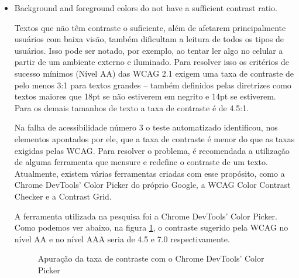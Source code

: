\documentclass[
	12pt,				%
	openright,			%
	oneside,			%
	a4paper,			%
	chapter=TITLE,		%
	section=TITLE,		%
	subsection=TITLE,	%
	subsubsection=TITLE,%
	english,			%
	brazil				%
	]{abntex2}
\theoremstyle{definition}
\begin{document}
\begin{itemize}
\pagebreak

   \item Background and foreground colors do not have a sufficient contrast ratio.
   
Textos que não têm contraste o suficiente, além de afetarem principalmente usuários com baixa visão, também dificultam a leitura de todos os tipos de usuários. Isso pode ser notado, por exemplo, ao tentar ler algo no celular a partir de um ambiente externo e iluminado. Para resolver isso os critérios de sucesso mínimos (Nível AA) das WCAG 2.1 exigem uma taxa de contraste de pelo menos 3:1 para textos grandes – também definidos pelas diretrizes como textos maiores que 18pt se não estiverem em negrito e 14pt se estiverem. Para os demais tamanhos de texto a taxa de contraste é de 4.5:1.

Na falha de acessibilidade número 3 o teste automatizado identificou, nos elementos apontados por ele, que a taxa de contraste é menor do que as taxas exigidas pelas WCAG. Para resolver o problema, é recomendada a utilização de alguma ferramenta que mensure e redefine o contraste de um texto. Atualmente, existem várias ferramentas criadas com esse propósito, como a Chrome DevTools' Color Picker do próprio Google, a WCAG Color Contrast Checker e a Contrast Grid.

A ferramenta utilizada na pesquisa foi a Chrome DevTools’ Color Picker. Como podemos ver abaixo, na figura \ref{Apuração da taxa de contraste com o Chrome DevTools’ Color Picker}, o contraste sugerido pela WCAG no nível AA e no nível AAA seria de 4.5 e 7.0 respectivamente.

\begin{figure}[!h]
\centering
\caption{Apuração da taxa de contraste com o Chrome DevTools’ Color Picker}
\label{Apuração da taxa de contraste com o Chrome DevTools’ Color Picker}
\end{figure}


\end{itemize}
\end{document}
